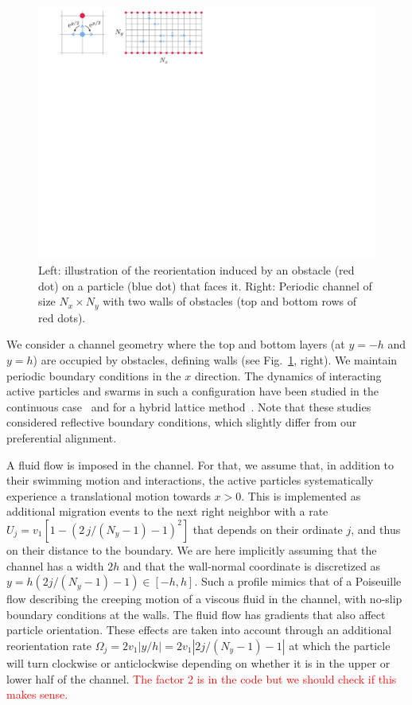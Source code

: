 \documentclass[aps,prl,twocolumn,amsmath,amssymb,superscriptaddress]{revtex4-1}
\newcommand{\obs}[1]{\textcolor{red}{#1}}
\begin{document}
\begin{figure}[h]
    \centering
    \includegraphics[width=.8\columnwidth]{sketch_lattice_channel.pdf}
    \caption{\label{fig:sketch_lattice_channel}Left: illustration of the reorientation induced by an obstacle (red dot) on a particle (blue dot) that faces it. Right: Periodic channel of size $N_x\times N_y$ with two walls of obstacles (top and bottom rows of red dots).}
\end{figure}

We consider a channel geometry where the top and bottom layers (at $y=-h$ and $y=h$) are occupied by obstacles, defining walls (see Fig.~\ref{fig:sketch_lattice_channel}, right). We maintain periodic boundary conditions in the $x$ direction. The dynamics of interacting active particles and swarms in such a configuration have been studied in the continuous case~\cite{armbruster2017swarming} and for a hybrid lattice method~\cite{kuhn2021lattice}. Note that these studies considered reflective boundary conditions, which slightly differ from our preferential alignment.

A fluid flow is imposed in the channel. For that, we assume that, in addition to their swimming motion and interactions, the active particles systematically experience a translational motion towards $x>0$. This is implemented as additional migration events to the next right neighbor with a rate $U_j = v_1[1-(2\,j/(N_y-1)-1)^2]$ that depends on their ordinate $j$, and thus on their distance to the boundary. We are here implicitly assuming that the channel has a width $2h$ and that the wall-normal coordinate is discretized as $y = h(2j/(N_y-1)-1)\in[-h,h]$. Such a profile mimics that of a Poiseuille flow describing the creeping motion of a viscous fluid in the channel, with no-slip boundary conditions at the walls. The fluid flow has gradients that also affect particle orientation. These effects are taken into account through an additional reorientation rate $\Omega_j = 2v_1 |y/h| = 2v_1|2j/(N_y-1)-1|$ at which the particle will turn clockwise or anticlockwise depending on whether it is in the upper or lower half of the channel. \obs{The factor 2 is in the code but we should check if this makes sense.}
\end{document}
